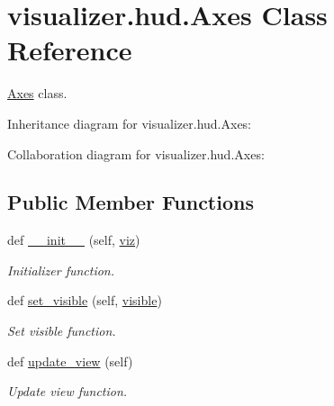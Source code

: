 \hypertarget{classvisualizer_1_1hud_1_1Axes}{}\section{visualizer.\+hud.\+Axes Class Reference}
\label{classvisualizer_1_1hud_1_1Axes}


\hyperlink{classvisualizer_1_1hud_1_1Axes}{Axes} class.  




Inheritance diagram for visualizer.\+hud.\+Axes\+:


Collaboration diagram for visualizer.\+hud.\+Axes\+:
\subsection*{Public Member Functions}
\begin{DoxyCompactItemize}
\item 
def \hyperlink{classvisualizer_1_1hud_1_1Axes_a44c5f2890171f9a87d7be8c0a0d06c1c}{\+\_\+\+\_\+init\+\_\+\+\_\+} (self, \hyperlink{classvisualizer_1_1hud_1_1Axes_a2ef949d1777934b9f320356f5f78f250}{viz})
\begin{DoxyCompactList}\small\item\em Initializer function. \end{DoxyCompactList}\item 
def \hyperlink{classvisualizer_1_1hud_1_1Axes_ab541f88e15b80a7b43fe180cd6008bfc}{set\+\_\+visible} (self, \hyperlink{classvisualizer_1_1hud_1_1Axes_ae1618ac7b34eb439fb93ec44f6b55347}{visible})
\begin{DoxyCompactList}\small\item\em Set visible function. \end{DoxyCompactList}\item 
def \hyperlink{classvisualizer_1_1hud_1_1Axes_aa14ec1cc14c11d259fea914a9dd23fb8}{update\+\_\+view} (self)
\begin{DoxyCompactList}\small\item\em Update view function. \end{DoxyCompactList}\end{DoxyCompactItemize}
